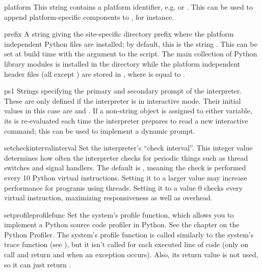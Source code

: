 \begin{datadesc}{platform}
This string contains a platform identifier, e.g.  or
.  This can be used to append platform-specific
components to , for instance. 
\end{datadesc}

\begin{datadesc}{prefix}
A string giving the site-specific directory prefix where the platform
independent Python files are installed; by default, this is the string
.  This can be set at build time with the
\code{-} argument to the  script.  The main
collection of Python library modules is installed in the directory
 while the platform
independent header files (all except ) are stored in
,
where  is equal to .

\end{datadesc}

\begin{datadesc}{ps1}
  Strings specifying the primary and secondary prompt of the
  interpreter.  These are only defined if the interpreter is in
  interactive mode.  Their initial values in this case are
   and .  If a non-string object is assigned
  to either variable, its  is re-evaluated each time
  the interpreter prepares to read a new interactive command; this can
  be used to implement a dynamic prompt.
\end{datadesc}

\begin{funcdesc}{setcheckinterval}{interval}
Set the interpreter's ``check interval''.  This integer value
determines how often the interpreter checks for periodic things such
as thread switches and signal handlers.  The default is , meaning
the check is performed every 10 Python virtual instructions.  Setting
it to a larger value may increase performance for programs using
threads.  Setting it to a value \code{<=} 0 checks every virtual instruction,
maximizing responsiveness as well as overhead.
\end{funcdesc}

\begin{funcdesc}{setprofile}{profilefunc}
  Set the system's profile function, which allows you to implement a
  Python source code profiler in Python.  See the chapter on the
  Python Profiler.  The system's profile function
  is called similarly to the system's trace function (see
  ), but it isn't called for each executed line of
  code (only on call and return and when an exception occurs).  Also,
  its return value is not used, so it can just return .
\end{funcdesc}

